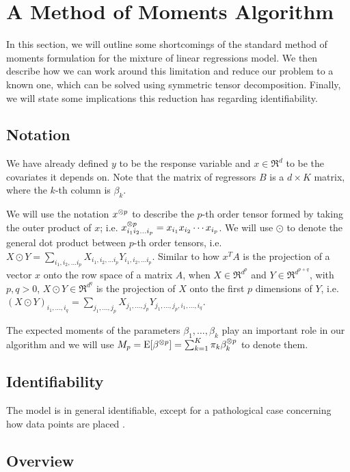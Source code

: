 \section{A Method of Moments Algorithm}
\label{sec:algo}

In this section, we will outline some shortcomings of the standard
method of moments formulation for the mixture of linear regressions
model. We then describe how we can work around this limitation and
reduce our problem to a known one, which can be solved using symmetric
tensor decomposition. Finally, we will state some implications this
reduction has regarding identifiability. 

\subsection{Notation}

We have already defined $y$ to be the response variable and $x \in
\Re^d$ to be the covariates it depends on. Note that the matrix of
regressors $B$ is a $d \times K$ matrix, where the $k$-th column is
$\beta_k$.

We will use the notation $x^{\otimes p}$ to describe the $p$-th order tensor
formed by taking the outer product of $x$; i.e. $x^{\otimes p}_{i_1 i_2 \ldots
i_p} = x_{i_1} x_{i_2} \cdots x_{i_p}$. We will use $\odot$ to denote
the general dot product between $p$-th order tensors, i.e. $X \odot
Y = \sum_{i_1, i_2, \ldots i_p} X_{i_1, i_2, \ldots i_p} Y_{i_1, i_2,
\ldots i_p}.$ Similar to how $x^T A$ is the projection of a vector $x$
onto the row space of a matrix $A$, when $X \in \Re^{d^p}$ and $Y \in
\Re^{d^{p+q}}$,  with $p, q > 0$, $X \odot Y \in \Re^{d^q}$ is the
projection of $X$ onto the first $p$ dimensions of $Y$, i.e. $(X \odot
Y)_{i_1, \ldots, i_q} = \sum_{j_1, \ldots, j_p} X_{j_1, \ldots, j_p}
Y_{j_1, \ldots, j_p, i_1, \ldots, i_q}$.

The expected moments of the parameters $\beta_1, \dots, \beta_k$ play an
important role in our algorithm and we will use $M_p = \operatorname{E}[\beta^{\otimes p}]
= \sum_{k=1}^{K} \pi_k \beta_k^{\otimes p}$ to denote them.

\subsection{Identifiability}

The model is in general identifiable, except for a pathological case
concerning how data points are placed \citationneeded.


\subsection{Overview}

